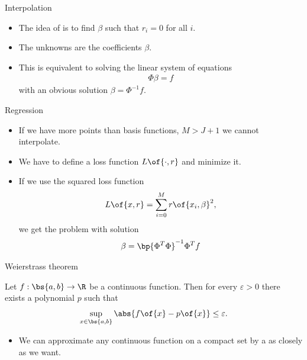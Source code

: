 \documentclass[11pt,xcolor={dvipsnames},aspectratio=159,hyperref={pdftex,pdfpagemode=UseNone,hidelinks,pdfdisplaydoctitle=true},usepdftitle=false]{beamer}
\begin{document}
\begin{frame}{Interpolation} 
    \begin{itemize}
        \item The idea of  is to find $\beta$ such that $r_i = 0$ for all $i$. 
        \item The unknowns are the coefficients $\beta$.
        \item This is equivalent to solving the linear system of equations 
        \begin{align*}
            \Phi \beta = f
        \end{align*}
        with an obvious solution $\beta = \Phi^{-1} f$.
    \end{itemize}
\end{frame}

\begin{frame}{Regression} 
    \begin{itemize}
        \item If we have more points than basis functions, $M>J+1$ we cannot interpolate. 
        \item We have to define a loss function $L\of{\cdot,r}$ and minimize it.
        \item If we use the squared loss function 
        \begin{align*}L\of{x,r} = \sum^M_{i=0} r\of{x_i,\beta}^2,\end{align*} we get the  problem with solution
        \begin{align*}
            \beta = \bp{\Phi^T \Phi}^{-1} \Phi^T f
        \end{align*}

    \end{itemize}
\end{frame}



\begin{frame}{Weierstrass theorem} 
    \begin{theorem}
        Let $f: \bs{a,b} \rightarrow \R$ be a continuous function. Then for every $\varepsilon > 0$ there exists a polynomial $p$ such that $$\sup_{x \in \bs{a,b}} \abs{f\of{x} - p\of{x}} \leq \varepsilon.$$
              \end{theorem}

        \begin{itemize}
        \item We can approximate any continuous function on a compact set by a  as closely as we want.
        \end{itemize}
\end{frame}
\end{document}
